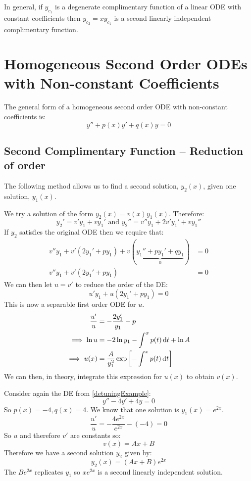 \documentclass[../main.tex]{subfiles}
\begin{document}
\begin{remark}[Note]
  In general, if $y_{c_1}$ is a degenerate complimentary function of a linear ODE with constant coefficients then $y_{c_2} = x y_{c_1}$ is a second linearly independent complimentary function.
\end{remark}
\section{Homogeneous Second Order ODEs with Non-constant Coefficients}
The general form of a homogeneous second order ODE with non-constant coefficients is:
\[
  y'' + p(x)y' + q(x)y = 0
\]
\subsection{Second Complimentary Function -- Reduction of order}
\label{reductionOrder}
The following method allows us to find a second solution, $y_2(x)$, given one solution, $y_1(x)$.

We try a solution of the form $y_2(x) = v(x)y_1(x)$.
Therefore:
\[
  y_2' = v'y_1 + vy_1' \text{ and } y_2'' = v''y_1 + 2v'y_1' + vy_1''
\]
If $y_2$ satisfies the original ODE then we require that:
\begin{align*}
  v''y_1 + v'(2y_1' + py_1) + v(\underbrace{y_1'' + py_1' + qy_1}_{0}) &= 0 \\
  v''y_1 + v'(2y_1' + py_1) &= 0
\end{align*}
We can then let $u = v'$ to reduce the order of the DE:
\[
  u'y_1 + u(2y_1' + py_1) = 0
\]
This is now a separable first order ODE for $u$.
\begin{align*}
  \frac{u'}{u} &= -\frac{2y_1'}{y_1} - p \\
  \implies \ln u &= -2 \ln y_1  - \int^{x} p(t) \d{t} + \ln A \\
  \implies u(x) &= \frac{A}{y^{2}_{1}}\exp\left[-\int^{x} p(t) \d{t}\right]
\end{align*}
We can then, in theory, integrate this expression for $u(x)$ to obtain $v(x)$.
\begin{example}
  Consider again the DE from \cref{detuningExample}:
  \[
    y'' - 4y' + 4y = 0
  \]
  So $p(x) = -4, q(x) = 4$.
  We know that one solution is $y_1(x) = e^{2x}$.
  \[
    \frac{u'}{u} = -\frac{4e^{2x}}{e^{2x}} - (-4) = 0
  \]
  So $u$ and therefore $v'$ are constants so:
  \[
    v(x) = Ax+B
  \]
  Therefore we have a second solution $y_2$ given by:
  \[
    y_2(x) = (Ax + B)e^{2x}
  \]
  The $Be^{2x}$ replicates $y_1$ so $xe^{2x}$ is a second linearly independent solution.
\end{example}
\end{document}
